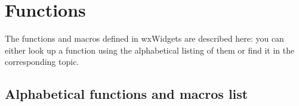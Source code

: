 
\chapter{Functions}\label{functions}
%
\setfooter{\thepage}{}{}{}{}{\thepage}

The functions and macros defined in wxWidgets are described here: you can
either look up a function using the alphabetical listing of them or find it in
the corresponding topic.

\section{Alphabetical functions and macros list}\label{functionsalphabetically}

